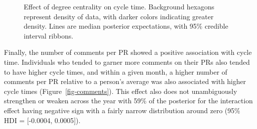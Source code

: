 \documentclass[manuscript,screen,review]{acmart}
\begin{document}
\begin{figure}


\caption[Degree centrality effect on cycle
time]{\label{fig-degree}Effect of degree centrality on cycle time.
Background hexagons represent density of data, with darker colors
indicating greater density. Lines are median posterior expectations,
with 95\% credible interval ribbons.}

\end{figure}%

Finally, the number of comments per PR showed a positive association
with cycle time. Individuals who tended to garner more comments on their
PRs also tended to have higher cycle times, and within a given month, a
higher number of comments per PR relative to a person's average was also
associated with higher cycle times (Figure~\ref{fig-comments}). This
effect also does not unambiguously strengthen or weaken across the year
with 59\% of the posterior for the interaction effect having negative
sign with a fairly narrow distribution around zero (95\% HDI =
{[}-0.0004, 0.0005{]}).
\end{document}
